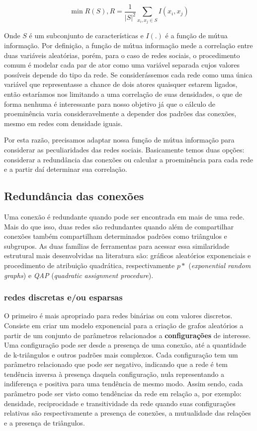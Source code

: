 \documentclass{article}
\begin{document}
\begin{equation}
\label{def:min_redun}
\min R(S), R = \frac{1}{|S|^2}\sum_{x_i, x_j \in S}I(x_i, x_j)
\end{equation}

Onde $S$ é um subconjunto de características e $I(.)$ é a função de mútua
informação. Por definição, a função de mútua informação mede a correlação entre
duas variáveis aleatórias, porém, para o caso de redes sociais, o procedimento
comum é modelar cada par de ator como uma variável separada cujos valores
possíveis depende do tipo da rede. Se considerássemos cada rede como uma única
variável que representasse a chance de dois atores quaisquer estarem ligados,
então estaríamos nos limitando a uma correlação de suas densidades, o que de
forma nenhuma é interessante para nosso objetivo já que o cálculo de
proeminência varia consideravelmente a depender dos padrões das conexões,
mesmo em redes com densidade iguais.

Por esta razão, precisamos adaptar nossa função de mútua informação para
considerar as peculiaridades das redes sociais. Basicamente temos duas opções:
considerar a redundância das conexões ou calcular a proeminência para cada
rede e a partir daí determinar sua correlação. 

\subsection{Redundância das conexões}

Uma conexão é redundante quando pode ser encontrada em mais de uma rede. Mais do
que isso, duas redes são redundantes quando além de compartilhar conexões também
compartilham determinados padrões como triângulos e subgrupos. As duas
famílias de ferramentas para acessar essa similaridade estrutural mais
desenvolvidas na literatura são: gráficos aleatórios exponenciais e procedimento
de atribuição quadrática, respectivamente $p*$ (\textit{exponential random
graphs}) e \textit{QAP} (\textit{quadratic assignment procedure}).

\subsubsection{redes discretas e/ou esparsas}

O primeiro é mais apropriado para redes binárias ou com valores discretos.
Consiste em criar um modelo exponencial para a criação de grafos aleatórios a
partir de um conjunto de parâmetros relacionados a \textbf{configurações} de
interesse. Uma configuração pode ser desde a presença de uma conexão, até a
quantidade de k-triângulos e outros padrões mais complexos. Cada configuração
tem um parâmetro relacionado que pode ser negativo, indicando que a rede é tem
tendência inversa à presença daquela configuração, nula representando a
indiferença e positiva para uma tendência de mesmo modo. Assim sendo, cada
parâmetro pode ser visto como tendências da rede em relação a, por exemplo:
densidade, reciprocidade e transitividade da rede quando suas configurações
relativas são respectivamente a presença de conexões, a mutualidade das
relações e a presença de triângulos. 
\end{document}
